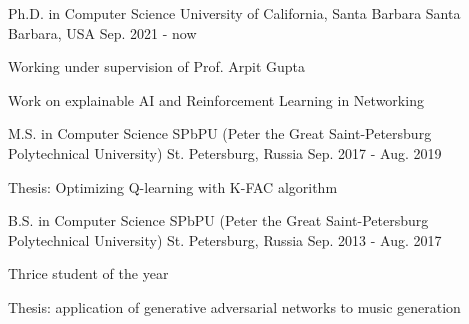 

\begin{cventries}

  \cventry
	{Ph.D. in Computer Science} %
	{University of California, Santa Barbara} %
	{Santa Barbara, USA} %
	{Sep. 2021 - now} %
	{
	  	\begin{cvitems} %
			\item {Working under supervision of Prof. Arpit Gupta}
	  		\item {Work on explainable AI and Reinforcement Learning in Networking}
	  	\end{cvitems}
	}
  
  \cventry
	{M.S. in Computer Science} %
	{SPbPU (Peter the Great Saint-Petersburg Polytechnical University)} %
	{St. Petersburg, Russia} %
	{Sep. 2017 - Aug. 2019} %
	{
	 	\begin{cvitems} %
	 		\item {Thesis: Optimizing Q-learning with K-FAC algorithm}
	 	\end{cvitems}
	}
    

  \cventry
	{B.S. in Computer Science} %
	{SPbPU (Peter the Great Saint-Petersburg Polytechnical University)} %
	{St. Petersburg, Russia} %
	{Sep. 2013 - Aug. 2017} %
	{
		\begin{cvitems} %
			\item {Thrice student of the year}
			\item {Thesis: application of generative adversarial networks to music generation}
		\end{cvitems}
	}

\end{cventries}
